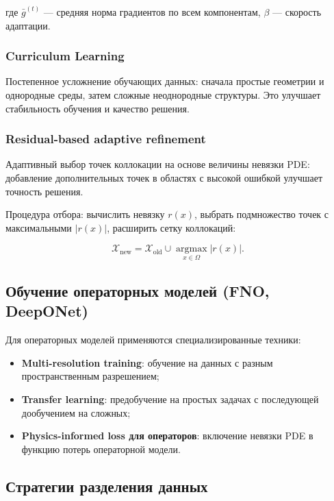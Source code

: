где $\bar{g}^{(t)}$ — средняя норма градиентов по всем компонентам, $\beta$ — скорость адаптации.

\subsubsection{Curriculum Learning}

Постепенное усложнение обучающих данных: сначала простые геометрии и однородные среды, затем сложные неоднородные структуры. Это улучшает стабильность обучения и качество решения.

\subsubsection{Residual-based adaptive refinement}

Адаптивный выбор точек коллокации на основе величины невязки PDE: добавление дополнительных точек в областях с высокой ошибкой улучшает точность решения.

Процедура отбора: вычислить невязку $r(x)$, выбрать подмножество точек с максимальными $|r(x)|$, расширить сетку коллокаций:

\begin{equation}
\mathcal{X}_{\text{new}} = \mathcal{X}_{\text{old}} \cup \operatorname*{argmax}_{x \in \Omega} |r(x)|.
\end{equation}

\subsection{Обучение операторных моделей (FNO, DeepONet)}

Для операторных моделей применяются специализированные техники:

\begin{itemize}
    \item \textbf{Multi-resolution training}: обучение на данных с разным пространственным разрешением;
    \item \textbf{Transfer learning}: предобучение на простых задачах с последующей дообучением на сложных;
    \item \textbf{Physics-informed loss для операторов}: включение невязки PDE в функцию потерь операторной модели.
\end{itemize}

\subsection{Стратегии разделения данных}

